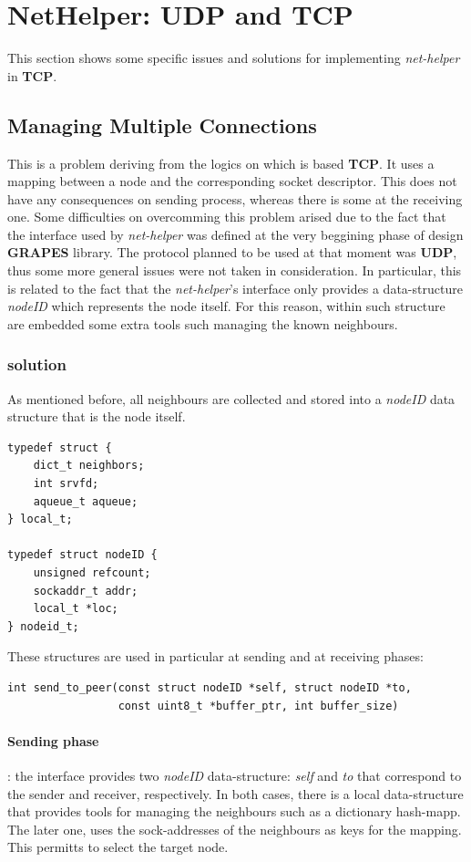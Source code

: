 \section{NetHelper: UDP and TCP}
This section shows some specific issues and solutions for implementing \textit{net-helper} in \textbf{TCP}.

\subsection{Managing Multiple Connections}
This is a problem deriving from the logics on which is based \textbf{TCP}. It uses a mapping between a node
and the corresponding socket descriptor. This does not have any consequences on sending process, whereas there
is some at the receiving one. Some difficulties on overcomming this problem arised due to the fact that the
interface used by \textit{net-helper} was defined at the very beggining phase of design \textbf{GRAPES}
library. The protocol planned to be used at that moment was \textbf{UDP}, thus some more general issues
were not taken in consideration. In particular, this is related to the fact that the \textit{net-helper}'s
interface only provides a data-structure \textit{nodeID} which represents the node itself. For this reason,
within such structure are embedded some extra tools such managing the known neighbours.

\subsubsection{solution}
As mentioned before, all neighbours are collected and stored into a \textit{nodeID} data structure that
is the node itself.
\begin{lstlisting}
typedef struct {
    dict_t neighbors;
    int srvfd;
    aqueue_t aqueue;
} local_t;

typedef struct nodeID {
    unsigned refcount;
    sockaddr_t addr;
    local_t *loc;
} nodeid_t;
\end{lstlisting}

These structures are used in particular at sending and at receiving phases:
\begin{lstlisting}
int send_to_peer(const struct nodeID *self, struct nodeID *to,
                 const uint8_t *buffer_ptr, int buffer_size)
\end{lstlisting}
\paragraph{Sending phase}: the interface provides two \textit{nodeID} data-structure: \textit{self} and
\textit{to} that correspond to the sender and receiver, respectively. In both cases, there is a local
data-structure that provides tools for managing the neighbours such as a dictionary hash-mapp. The later
one, uses  the sock-addresses of the neighbours as keys for the mapping. This permitts to select the target
node.


